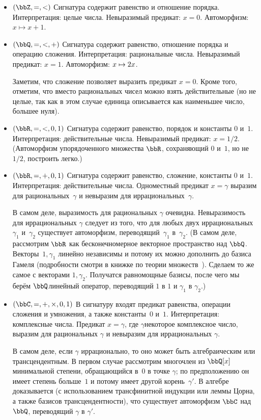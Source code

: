 \begin{itemize}
        \item
$(\bbZ,{=},{<})$ %
Сигнатура содержит равенство и отношение порядка. Интерпретация:
целые числа. Невыразимый предикат: $x=0$. Автоморфизм: $x\mapsto
x+1$.
        \item
$(\bbQ,{=},{<},{+})$ %
Сигнатура содержит равенство, отношение порядка и операцию
сложения. Интерпретация: рациональные числа. Невыразимый
предикат: $x=1$. Автоморфизм: $x\hm\mapsto 2x$.

Заметим, что сложение позволяет выразить предикат $x=0$.
Кроме того, отметим, что вместо рациональных чисел можно взять
действительные (но не целые, так как в этом случае единица
описывается как наименьшее число, большее нуля).

        \item
$(\bbR,{=},{<},0,1)$ %
Сигнатура содержит равенство, порядок и константы $0$ и~$1$.
Интерпретация: действительные числа. Невыразимый предикат:
$x=1/2$. (Автоморфизм упорядоченного множества $\bbR$, сохраняющий
$0$ и~$1$, но не $1/2$, построить легко.)
        \item
$(\bbR,{=},{+}, 0, 1)$ %
Сигнатура содержит равенство, сложение, константы $0$ и~$1$.
Интерпретация: действительные числа. Одноместный предикат
$x=\gamma$ выразим для рациональных~$\gamma$ и невыразим для
иррациональных~$\gamma$.

В самом деле, выразимость для рациональных $\gamma$ очевидна.
Не\-вы\-ра\-зи\-мость для иррациональных $\gamma$ следует из того, что
для любых двух иррациональных~$\gamma_1$ и~$\gamma_2$ существует
автоморфизм, переводящий~$\gamma_1$ в~$\gamma_2$. (В самом деле,
рассмотрим $\bbR$ как бесконечномерное векторное пространство
над $\bbQ$. Векторы~$1,\gamma_1$ линейно независимы и потому их
можно дополнить до базиса Гамеля (подробности смотри в книжке по
теории множеств~\cite{naive-set-theory}). Сделаем то же самое с
векторами $1,\gamma_2$. Получатся равномощные базисы, после чего
мы берём $\bbQ$\д линейный оператор, переводящий $1$ в $1$ и
$\gamma_1$ в $\gamma_2$.)
        \item
$(\bbC,{=},{+},{\times},0,1)$ %
В сигнатуру входят предикат ра\-вен\-с\-т\-ва, операции сложения и
умножения, а также константы~$0$ и~$1$. Интерпретация:
комплексные числа. Предикат $x=\gamma$, где $\gamma$\т некоторое
комплексное число, выразим для рациональных $\gamma$ и невыразим
для иррациональных $\gamma$.

В самом деле, если $\gamma$ иррационально, то оно может быть
алгебраическим или трансцендентным. В первом случае рассмотрим
многочлен из $\bbQ[x]$ минимальной степени, обращающийся в~$0$ в
точке $\gamma$; по предположению он имеет степень больше~$1$ и
потому имеет другой корень~$\gamma'$. В алгебре доказывается (с
использованием трансфинитной индукции или леммы Цорна, а также
базисов трансцендентности), что существует автоморфизм $\bbC$
над $\bbQ$, переводящий $\gamma$ в $\gamma'$.


\end{itemize}
